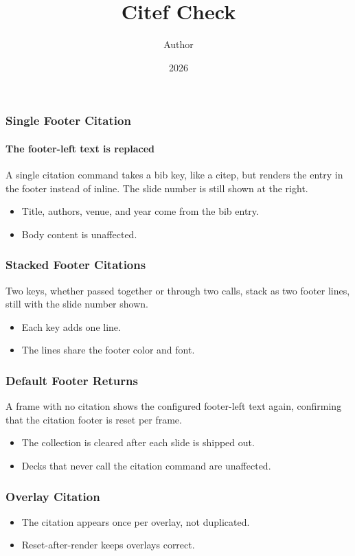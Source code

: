 \documentclass[notheorems,aspectratio=169]{beamer}
\title{Citef Check}
\author{Author}
\date{2026}
\begin{document}
\maketitle

\begin{frame}
  \frametitle{Single Footer Citation}
  \framesubtitle{The footer-left text is replaced}
  A single citation command takes a bib key, like a citep, but renders the entry in the
  footer instead of inline. The slide number is still shown at the right.
  \begin{itemize}
    \item Title, authors, venue, and year come from the bib entry.
    \item Body content is unaffected.
  \end{itemize}
\end{frame}

\begin{frame}
  \frametitle{Stacked Footer Citations}
  Two keys, whether passed together or through two calls, stack as two footer lines, still
  with the slide number shown.
  \begin{itemize}
    \item Each key adds one line.
    \item The lines share the footer color and font.
  \end{itemize}
\end{frame}

\begin{frame}
  \frametitle{Default Footer Returns}
  A frame with no citation shows the configured footer-left text again, confirming that the
  citation footer is reset per frame.
  \begin{itemize}
    \item The collection is cleared after each slide is shipped out.
    \item Decks that never call the citation command are unaffected.
  \end{itemize}
\end{frame}

\begin{frame}
  \frametitle{Overlay Citation}
  \begin{itemize}
    \item The citation appears once per overlay, not duplicated.
    \item Reset-after-render keeps overlays correct.
  \end{itemize}
\end{frame}
\end{document}
